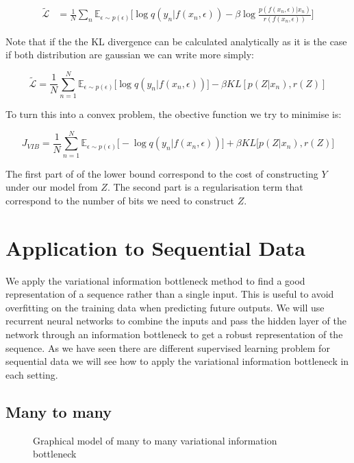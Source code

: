 \documentclass[10pt,oneside,openright]{report}
\begin{document}
 \begin{align}
\tilde{\mathcal{L}}   &= \frac{1}{N}\sum_n  \mathbb{E}_{\epsilon \sim p(\epsilon)}\Big[  \log q(y_n|f(x_n, \epsilon)) - \beta  \log \frac{p(f(x_n, \epsilon)|x_n)}{r(f(x_n, \epsilon))}\Big]  \label{eq:lower2}
\end{align}

Note that if the the KL divergence can be calculated analytically as it is the case if both distribution are gaussian we can write more simply:

 $$ \tilde{\mathcal{L}}  = \frac{1}{N}  \sum_{n=1}^{N} \mathbb{E}_{\epsilon \sim p(\epsilon)}\Big[\log q(y_{n} |f(x_{n}, \epsilon))\Big] - \beta KL[p(Z|x_{n}), r(Z)]$$

To turn this into a convex problem, the obective function we try to minimise is:

 $$ J_{VIB} = \frac{1}{N}  \sum_{n=1}^{N} \mathbb{E}_{\epsilon \sim p(\epsilon)}\Big[-\log q(y_{n} |f(x_{n}, \epsilon))\Big] + \beta KL\big[p(Z|x_{n}), r(Z)\big]$$


The first part of of the lower bound correspond to the cost of constructing $Y$ under our model from $Z$. The second part is a regularisation term that correspond to the number of bits we need to construct $Z$.

\section{Application to Sequential Data}

We apply the variational information bottleneck method to find a good representation of a sequence rather than a single input. This is useful to avoid overfitting on the training data when predicting future outputs. We will use recurrent neural networks to combine the inputs and pass the hidden layer of the network through an information bottleneck to get a robust representation of the sequence. As we have seen there are different supervised learning problem for sequential data we will see how to apply the variational information bottleneck in each setting.

\subsection{Many to many}
\begin{figure}[H]
\centering
{}
\caption{Graphical model of many to many variational information bottleneck}
\end{figure}
\end{document}
